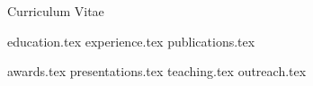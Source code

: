 \documentclass[letterpaper,11pt]{article}
\begin{document}
Curriculum Vitae


{education.tex}
{experience.tex}
{publications.tex}


{awards.tex}
{presentations.tex}
{teaching.tex}
{outreach.tex}
\end{document}
